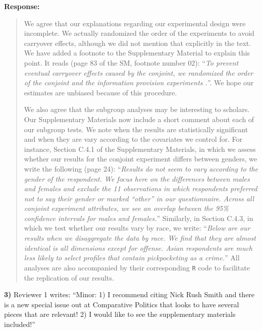 \documentclass[a4paper,12pt]{article}
\begin{document}
\noindent \textbf{Response:} 
\begin{quote}

We agree that our explanations regarding our experimental design were
incomplete. We actually randomized the order of the experiments to avoid
carryover effects, although we did not mention that explicitly in the text. We
have added a footnote to the Supplementary Material to explain this point. It
reads (page 83 of the SM, footnote number 02): ``\textit{To prevent eventual
  carryover effects caused by the conjoint, we randomized the order of the
  conjoint and the information provision experiments
\citep{perreault1975controlling}.}''. We hope our estimates are unbiased
because of this procedure.

We also agree that the subgroup analyses may be interesting to scholars. Our
Supplementary Materials now include a short comment about each of our subgroup
tests. We note when the results are statistically significant and when they are
vary according to the covariates we control for. For instance, Section C.4.1 of
the Supplementary Materials, in which we assess whether our results for the
conjoint experiment differs between genders, we write the following (page 24):
``\textit{Results do not seem to vary according to the gender of the
  respondent. We focus here on the differences between males and females and
  exclude the 11 observations in which respondents preferred not to say their
  gender or marked ``other'' in our questionnaire. Across all conjoint
experiment attributes, we see an overlap between the 95\% confidence intervals
for males and females.}'' Similarly, in Section C.4.3, in which we test whether
our results vary by race, we write: ``\textit{Below are our results when we
disaggregate the data by race. We find that they are almost identical is all
dimensions except for offense. Asian respondents are much less likely to select
profiles that contain pickpocketing as a crime.}''  All analyses are also
accompanied by their corresponding \texttt{R} code to facilitate the
replication of our results.

\end{quote}

\vspace{.3cm}

\noindent \textbf{3)} Reviewer 1 writes: ``Minor: 1) I recommend citing Nick
Rush Smith and there is a new special issue out at Comparative Politics that
looks to have several pieces that are relevant! 2) I would like to see the
supplementary materials included!''
\end{document}

